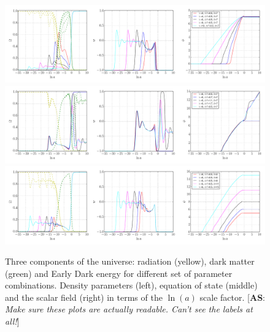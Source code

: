 \documentclass[preprintnumbers,amsmath,amssymb,prd,superscriptaddress,notitlepag
e, twocolumn]{revtex4-1}
\def\as#1{[\textbf{AS}: \textit{#1}] }
\begin{document}
 
 \begin{figure}[h!]
\hspace*{-0.in}
 \includegraphics[scale=0.31]{Quintb_vl}\\
 \hspace*{-0.in}
  \includegraphics[scale=0.31]{Quintb_vAl}\\
  \hspace*{-0.in}
  \includegraphics[scale=0.31]{Quintb_vB}\\
 \caption{  Three components of the universe: radiation (yellow), dark matter (green) 
 and Early Dark energy for different set of parameter combinations.
Density parameters (left), equation of state (middle) and the scalar
field (right) in terms of the $\ln(a)$ scale factor.
\as{Make sure these plots are actually readable. Can't see the labels
  at all!}
 }
 \label{fig:fig1}
\end{figure} 



\end{document}
